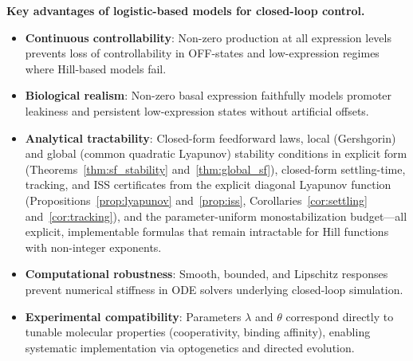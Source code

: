\documentclass[12pt]{article}
\begin{document}
\medskip
\noindent\textbf{Key advantages of logistic-based models for closed-loop control.}
\begin{itemize}
  \item \textbf{Continuous controllability}: Non-zero production at all
        expression levels prevents loss of controllability in OFF-states and
        low-expression regimes where Hill-based models fail.
  \item \textbf{Biological realism}: Non-zero basal expression faithfully models
        promoter leakiness and persistent low-expression states without
        artificial offsets.
  \item \textbf{Analytical tractability}: Closed-form feedforward laws,
        local (Gershgorin) and global (common quadratic Lyapunov)
        stability conditions in explicit form
        (Theorems~\ref{thm:sf_stability} and~\ref{thm:global_sf}),
        closed-form settling-time, tracking, and ISS certificates from
        the explicit diagonal Lyapunov function
        (Propositions~\ref{prop:lyapunov} and~\ref{prop:iss},
        Corollaries~\ref{cor:settling} and~\ref{cor:tracking}), and the parameter-uniform
        monostabilization budget---all explicit, implementable formulas
        that remain intractable for Hill functions with non-integer
        exponents.
  \item \textbf{Computational robustness}: Smooth, bounded, and Lipschitz
        responses prevent numerical stiffness in ODE solvers underlying
        closed-loop simulation.
  \item \textbf{Experimental compatibility}: Parameters $\lambda$ and $\theta$
        correspond directly to tunable molecular properties (cooperativity,
        binding affinity), enabling systematic implementation via optogenetics
        and directed evolution.
\end{itemize}
\end{document}
